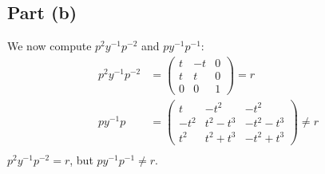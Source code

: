 \documentclass{article}
\begin{document}
\subsection*{Part (b)}
We now compute $p^2y^{-1}p^{-2}$ and $py^{-1}p^{-1}$:
\begin{equation}
    \begin{split}
        p^2y^{-1}p^{-2} & = 
        \begin{pmatrix} 
            t & -t & 0 \\
            t & t & 0  \\
            0 & 0 & 1
        \end{pmatrix} = r \\
        py^{-1}p & =  
        \begin{pmatrix} 
            t & -t^2 & -t^2 \\
            -t^2 & t^2 - t^3 & -t^2 - t^3 \\
            t^2 & t^2 + t^3 & -t^2 + t^3
        \end{pmatrix} \neq r \\
    \end{split}
\end{equation}
$p^2y^{-1}p^{-2} = r$, but $py^{-1}p^{-1} \neq r$.

\newpage

\problem
\end{document}
